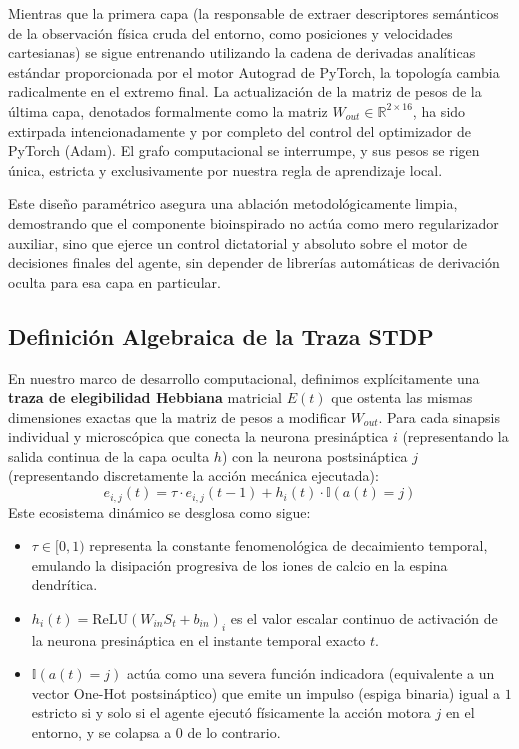 \documentclass[a4paper,12pt,twocolumn]{article}
\begin{document}
Mientras que la primera capa (la responsable de extraer descriptores semánticos de la observación física cruda del entorno, como posiciones y velocidades cartesianas) se sigue entrenando utilizando la cadena de derivadas analíticas estándar proporcionada por el motor Autograd de PyTorch, la topología cambia radicalmente en el extremo final. La actualización de la matriz de pesos de la última capa, denotados formalmente como la matriz $W_{out} \in \mathbb{R}^{2 \times 16}$, ha sido extirpada intencionadamente y por completo del control del optimizador de PyTorch (Adam). El grafo computacional se interrumpe, y sus pesos se rigen única, estricta y exclusivamente por nuestra regla de aprendizaje local. 

Este diseño paramétrico asegura una ablación metodológicamente limpia, demostrando que el componente bioinspirado no actúa como mero regularizador auxiliar, sino que ejerce un control dictatorial y absoluto sobre el motor de decisiones finales del agente, sin depender de librerías automáticas de derivación oculta para esa capa en particular.

\subsection{Definición Algebraica de la Traza STDP}
En nuestro marco de desarrollo computacional, definimos explícitamente una \textbf{traza de elegibilidad Hebbiana} matricial $E(t)$ que ostenta las mismas dimensiones exactas que la matriz de pesos a modificar $W_{out}$. Para cada sinapsis individual y microscópica que conecta la neurona presináptica $i$ (representando la salida continua de la capa oculta $h$) con la neurona postsináptica $j$ (representando discretamente la acción mecánica ejecutada):
\begin{equation}
    e_{i,j}(t) = \tau \cdot e_{i,j}(t-1) + h_i(t) \cdot \mathbb{I}(a(t) = j)
\end{equation}
Este ecosistema dinámico se desglosa como sigue:
\begin{itemize}
    \item $\tau \in [0, 1)$ representa la constante fenomenológica de decaimiento temporal, emulando la disipación progresiva de los iones de calcio en la espina dendrítica.
    \item $h_i(t) = \text{ReLU}(W_{in} S_t + b_{in})_i$ es el valor escalar continuo de activación de la neurona presináptica en el instante temporal exacto $t$.
    \item $\mathbb{I}(a(t) = j)$ actúa como una severa función indicadora (equivalente a un vector One-Hot postsináptico) que emite un impulso (espiga binaria) igual a $1$ estricto si y solo si el agente ejecutó físicamente la acción motora $j$ en el entorno, y se colapsa a $0$ de lo contrario.
\end{itemize}
\end{document}
